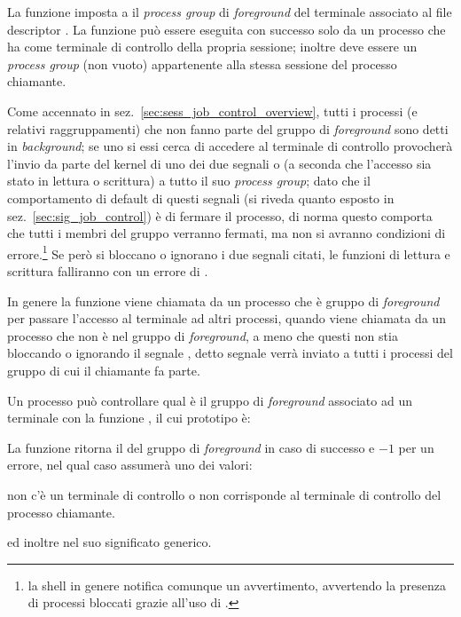 La funzione imposta a  il \textit{process group} di
\textit{foreground} del terminale associato al file descriptor . La
funzione può essere eseguita con successo solo da un processo che
ha  come terminale di controllo della propria sessione;
inoltre  deve essere un \textit{process group} (non vuoto)
appartenente alla stessa sessione del processo chiamante.

Come accennato in sez.~\ref{sec:sess_job_control_overview}, tutti i processi
(e relativi raggruppamenti) che non fanno parte del gruppo di
\textit{foreground} sono detti in \textit{background}; se uno si essi cerca di
accedere al terminale di controllo provocherà l'invio da parte del kernel di
uno dei due segnali  o  (a seconda che
l'accesso sia stato in lettura o scrittura) a tutto il suo \textit{process
  group}; dato che il comportamento di default di questi segnali (si riveda
quanto esposto in sez.~\ref{sec:sig_job_control}) è di fermare il processo, di
norma questo comporta che tutti i membri del gruppo verranno fermati, ma non
si avranno condizioni di errore.\footnote{la shell in genere notifica comunque
  un avvertimento, avvertendo la presenza di processi bloccati grazie all'uso
  di .} Se però si bloccano o ignorano i due segnali citati, le
funzioni di lettura e scrittura falliranno con un errore di .

In genere la funzione viene chiamata da un processo che è gruppo di
\textit{foreground} per passare l'accesso al terminale ad altri processi,
quando viene chiamata da un processo che non è nel gruppo di
\textit{foreground}, a meno che questi non stia bloccando o ignorando il
segnale , detto segnale verrà inviato a tutti i processi del
gruppo di cui il chiamante fa parte.

Un processo può controllare qual è il gruppo di \textit{foreground} associato
ad un terminale con la funzione , il cui prototipo è:

\begin{funcproto}{
}

{La funzione ritorna il  del gruppo di \textit{foreground} in caso
  di successo e $-1$ per un errore, nel qual caso  assumerà uno dei
  valori:
  \begin{errlist}
    \item[\errcode{ENOTTY}] non c'è un terminale di controllo o  non
      corrisponde al terminale di controllo del processo chiamante.
  \end{errlist}
  ed inoltre  nel suo significato generico.}
\end{funcproto}

